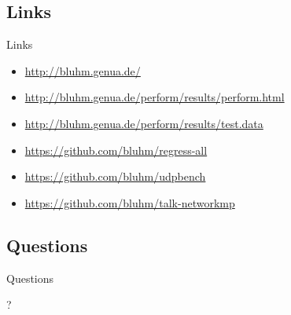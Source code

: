\documentclass[14pt,aspectratio=169]{beamer}
\begin{document}
\subsection{Links}
\begin{frame}{Links}
\begin{itemize}
    \small
    \item \url{http://bluhm.genua.de/}
    \item \url{http://bluhm.genua.de/perform/results/perform.html}
    \item \url{http://bluhm.genua.de/perform/results/test.data}
    \item \url{https://github.com/bluhm/regress-all}
    \item \url{https://github.com/bluhm/udpbench}
    \item \url{https://github.com/bluhm/talk-networkmp}
\end{itemize}
\end{frame}

\subsection{Questions}
\begin{frame}{Questions}
\begin{center}
?
\end{center}
\end{frame}
\end{document}
